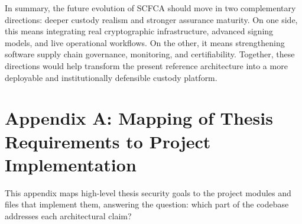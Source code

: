 \documentclass[12pt,a4paper]{report}
\begin{document}
In summary, the future evolution of SCFCA should move in two complementary directions: deeper custody realism and stronger assurance maturity. On one side, this means integrating real cryptographic infrastructure, advanced signing models, and live operational workflows. On the other, it means strengthening software supply chain governance, monitoring, and certifiability. Together, these directions would help transform the present reference architecture into a more deployable and institutionally defensible custody platform.

\appendix
\chapter*{Appendix A: Mapping of Thesis Requirements to Project Implementation}

This appendix maps high-level thesis security goals to the project modules and files that implement them, answering the question: which part of the codebase addresses each architectural claim?
\end{document}

